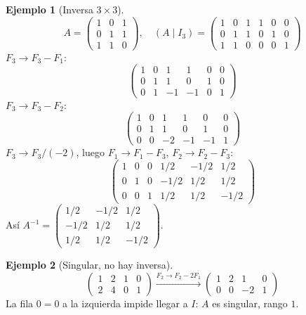 \documentclass[a4paper,12pt]{article}
\theoremstyle{definition}
\newtheorem{ejemplo}{Ejemplo}[section]
\begin{document}
\begin{ejemplo}[Inversa $3 \times 3$]
\[
A=\begin{pmatrix} 1 & 0 & 1 \\ 0 & 1 & 1 \\ 1 & 1 & 0 \end{pmatrix}, \quad (A\mid I_3)=
\left(\begin{array}{ccc|ccc}
1 & 0 & 1 & 1 & 0 & 0 \\
0 & 1 & 1 & 0 & 1 & 0 \\
1 & 1 & 0 & 0 & 0 & 1
\end{array}\right)
\]
$F_3 \to F_3-F_1$:
\[
\left(\begin{array}{ccc|ccc}
1 & 0 & 1 & 1 & 0 & 0 \\
0 & 1 & 1 & 0 & 1 & 0 \\
0 & 1 & -1 & -1 & 0 & 1
\end{array}\right)
\]
$F_3 \to F_3-F_2$:
\[
\left(\begin{array}{ccc|ccc}
1 & 0 & 1 & 1 & 0 & 0 \\
0 & 1 & 1 & 0 & 1 & 0 \\
0 & 0 & -2 & -1 & -1 & 1
\end{array}\right)
\]
$F_3 \to F_3/(-2)$, luego $F_1 \to F_1-F_3$, $F_2 \to F_2-F_3$:
\[
\left(\begin{array}{ccc|ccc}
1 & 0 & 0 & 1/2 & -1/2 & 1/2 \\
0 & 1 & 0 & -1/2 & 1/2 & 1/2 \\
0 & 0 & 1 & 1/2 & 1/2 & -1/2
\end{array}\right)
\]
Así $A^{-1}=\begin{pmatrix} 1/2 & -1/2 & 1/2 \\ -1/2 & 1/2 & 1/2 \\ 1/2 & 1/2 & -1/2 \end{pmatrix}$.
\end{ejemplo}

\begin{ejemplo}[Singular, no hay inversa]
\[
\left(\begin{array}{cc|cc}
1 & 2 & 1 & 0 \\
2 & 4 & 0 & 1
\end{array}\right)
\xrightarrow{F_2 \to F_2-2F_1}
\left(\begin{array}{cc|cc}
1 & 2 & 1 & 0 \\
0 & 0 & -2 & 1
\end{array}\right)
\]
La fila $0=0$ a la izquierda impide llegar a $I$: $A$ es singular, rango $1$.
\end{ejemplo}
\end{document}
